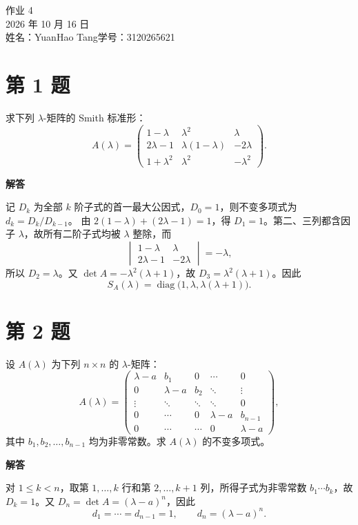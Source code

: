 \documentclass[UTF8,10pt,letterpaper,fontset=fandol]{ctexart}
\newcommand{\Solution}{\par\Needspace{4\baselineskip}\textbf{解答}\par}
\begin{document}
\begin{center}
{\LARGE 作业 4}\\[0.6em]
2026 年 10 月 16 日\\[0.25em]
姓名：YuanHao Tang\quad 学号：3120265621
\end{center}

\section{第 1 题}
求下列 $\lambda$-矩阵的 Smith 标准形：
\[
A(\lambda)=\begin{pmatrix}
1-\lambda&\lambda^2&\lambda\\
2\lambda-1&\lambda(1-\lambda)&-2\lambda\\
1+\lambda^2&\lambda^2&-\lambda^2
\end{pmatrix}.
\]
\Solution
记 $D_k$ 为全部 $k$ 阶子式的首一最大公因式，$D_0=1$，则不变多项式为 $d_k=D_k/D_{k-1}$。
由 $2(1-\lambda)+(2\lambda-1)=1$，得 $D_1=1$。第二、三列都含因子 $\lambda$，故所有二阶子式均被 $\lambda$ 整除，而
\[
\begin{vmatrix}1-\lambda&\lambda\\2\lambda-1&-2\lambda\end{vmatrix}=-\lambda,
\]
所以 $D_2=\lambda$。又 $\det A=-\lambda^2(\lambda+1)$，故 $D_3=\lambda^2(\lambda+1)$。因此
\[
\boxed{S_A(\lambda)=\operatorname{diag}\bigl(1,\lambda,\lambda(\lambda+1)\bigr)}.
\]

\section{第 2 题}
设 $A(\lambda)$ 为下列 $n\times n$ 的 $\lambda$-矩阵：
\[
A(\lambda)=\begin{pmatrix}
\lambda-a&b_1&0&\cdots&0\\
0&\lambda-a&b_2&\ddots&\vdots\\
\vdots&\ddots&\ddots&\ddots&0\\
0&\cdots&0&\lambda-a&b_{n-1}\\
0&\cdots&\cdots&0&\lambda-a
\end{pmatrix},
\]
其中 $b_1,b_2,\ldots,b_{n-1}$ 均为非零常数。求 $A(\lambda)$ 的不变多项式。
\Solution
对 $1\le k<n$，取第 $1,\ldots,k$ 行和第 $2,\ldots,k+1$ 列，所得子式为非零常数
$b_1\cdots b_k$，故 $D_k=1$。又 $D_n=\det A=(\lambda-a)^n$，因此
\[
\boxed{d_1=\cdots=d_{n-1}=1,\qquad d_n=(\lambda-a)^n}.
\]

\newpage
\end{document}
